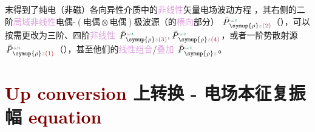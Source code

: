  末得到了\textcolor{PineGreen}{纯电（非磁）各向异性}介质中的\textcolor{Plum}{非线性}矢量电场波动方程 ，其右侧的二阶\textcolor{Plum}{局域}\textcolor{Plum}{非线性}\textcolor{NavyBlue}{电偶-$(\text{电偶}\otimes\text{电偶})$}极\textcolor{NavyBlue}{波源}（的\textcolor{Plum}{横向}部分） $\xint{\mathcolor{gray}{-}}{25}{\bar{P}}^{\;\! \mathcolor{gray}{\omega} \textcolor{PineGreen}{\imath}}_{\;\! \symup{\rho} \mathcolor{gray}{z} \textcolor{Maroon}{(2)}}$（），可以按需更改为三阶、四阶\textcolor{Plum}{非线性} $\xint{\mathcolor{gray}{-}}{25}{\bar{P}}^{\;\! \mathcolor{gray}{\omega} \textcolor{PineGreen}{\imath}}_{\;\! \symup{\rho} \mathcolor{gray}{z} \textcolor{Maroon}{(3)}}, \xint{\mathcolor{gray}{-}}{25}{\bar{P}}^{\;\! \mathcolor{gray}{\omega} \textcolor{PineGreen}{\imath}}_{\;\! \symup{\rho} \mathcolor{gray}{z} \textcolor{Maroon}{(4)}}$，或者一阶\textcolor{NavyBlue}{势散射}源 $\xint{\mathcolor{gray}{-}}{25}{\bar{P}}^{\;\! \mathcolor{gray}{\omega} \textcolor{PineGreen}{\imath}}_{\;\! \symup{\rho} \mathcolor{gray}{z} \textcolor{Maroon}{(1)}}$（），甚至他们的\textcolor{Plum}{线性组合}/\textcolor{Plum}{叠加} $\xint{\mathcolor{gray}{-}}{25}{\bar{P}}^{\;\! \mathcolor{gray}{\omega} \textcolor{PineGreen}{\imath}}_{\;\! \symup{\rho} \mathcolor{gray}{z}}$。

\section{\textcolor{Maroon}{Up conversion} 上转换 - 电场本征复振幅 \textcolor{Maroon}{equation}}\label{sec:up_convert}

